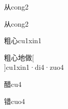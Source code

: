 \begin{verbete}[4]{从}{cong2}
\end{verbete}
\begin{verbete*}[4]{从}{cong2}
\end{verbete*}

\begin{verbete}[11;4]{粗心}{cu1xin1}
\end{verbete}

\begin{verbete}[11;4;6;11]{粗心地做}[\\]{cu1xin1·di4·zuo4}
\end{verbete}

\begin{verbete}[15]{醋}{cu4}
\end{verbete}

\begin{verbete}[13]{错}{cuo4}
\end{verbete}



